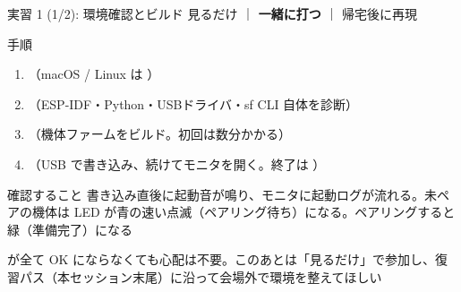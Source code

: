 \begin{frame}[fragile]{実習 1 (1/2): 環境確認とビルド}
  \vspace{0.15em}
  {\small 見るだけ ｜ \textcolor{sfblue}{\textbf{一緒に打つ}} ｜ 帰宅後に再現}

  \begin{block}{手順}
    \begin{enumerate}\footnotesize\setlength{\itemsep}{0pt}
      \item {}（macOS / Linux は ）
      \item {}（ESP-IDF・Python・USBドライバ・sf CLI 自体を診断）
      \item {}（機体ファームをビルド。初回は数分かかる）
      \item {}（USB で書き込み、続けてモニタを開く。終了は \code{Ctrl+]}）
    \end{enumerate}
  \end{block}

  \begin{exampleblock}{確認すること}
    \footnotesize 書き込み直後に起動音が鳴り、モニタに起動ログが流れる。未ペアの機体は LED が青の速い点滅（ペアリング待ち）になる。ペアリングすると緑（準備完了）になる
  \end{exampleblock}

  {\footnotesize {} が全て OK にならなくても心配は不要。このあとは「見るだけ」で参加し、復習パス（本セッション末尾）に沿って会場外で環境を整えてほしい}
\end{frame}

